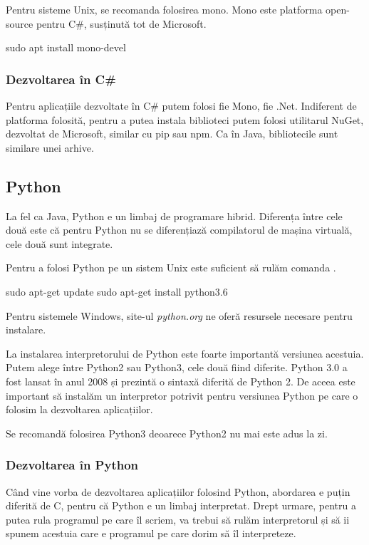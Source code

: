 Pentru sisteme Unix, se recomanda folosirea mono. Mono este platforma
open-source pentru C\#, susținută tot de Microsoft.

sudo apt install mono-devel

\subsubsection{Dezvoltarea în C\#}
\label{sec:appdev-ideinstall-cs-dev}

Pentru aplicațiile dezvoltate în C\# putem folosi fie Mono, fie .Net. Indiferent
de platforma folosită, pentru a putea instala biblioteci putem folosi utilitarul
NuGet, dezvoltat de Microsoft, similar cu pip sau npm. Ca în Java, bibliotecile
sunt similare unei arhive.

\subsection{Python}
\label{sec:appdev-ideinstall-python}

La fel ca Java, Python e un limbaj de programare hibrid. Diferența între cele
două este că pentru Python nu se diferențiază compilatorul de mașina virtuală,
cele două sunt integrate.

Pentru a folosi Python pe un sistem Unix este suficient să rulăm comanda
.

\begin{screen}
sudo apt-get update
sudo apt-get install python3.6
\end{screen}

Pentru sistemele Windows, site-ul \textit{python.org} ne oferă resursele
necesare pentru instalare.

La instalarea interpretorului de Python este foarte importantă versiunea
acestuia. Putem alege între Python2 sau Python3, cele două fiind diferite.
Python 3.0 a fost lansat în anul 2008 și prezintă o sintaxă diferită de Python
2. De aceea este important să instalăm un interpretor potrivit pentru versiunea
Python pe care o folosim la dezvoltarea aplicațiilor.

Se recomandă folosirea Python3 deoarece Python2 nu mai este adus la zi.

\subsubsection{Dezvoltarea în Python}
\label{sec:appdev-ideinstall-python-dev}

Când vine vorba de dezvoltarea aplicațiilor folosind Python, abordarea e puțin
diferită de C, pentru că Python e un limbaj interpretat. Drept urmare, pentru a
putea rula programul pe care îl scriem, va trebui să rulăm interpretorul și să
ii spunem acestuia care e programul pe care dorim să îl interpreteze.

